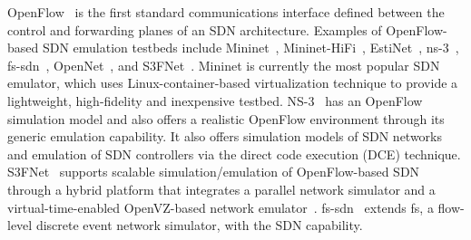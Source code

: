 OpenFlow~\cite{Openflow} is the first standard communications interface defined between the control and forwarding planes of an SDN architecture. 
Examples of OpenFlow-based SDN emulation testbeds include Mininet~\cite{LaptopSDN},
Mininet-HiFi~\cite{ReproNetExprCBE}, EstiNet~\cite{EstiNet}, ns-3~\cite{NS-3}, fs-sdn~\cite{FSSDN}, OpenNet~\cite{OpenNet}, and S3FNet~\cite{jin2013parallel}.
Mininet is currently the most popular SDN emulator, which uses Linux-container-based virtualization technique to provide a lightweight, high-fidelity and inexpensive testbed.
NS-3~\cite{NS-3} has an OpenFlow simulation model and also offers a realistic OpenFlow environment through its generic emulation capability.
It also offers simulation models of SDN networks and emulation of SDN controllers via the direct code execution (DCE) technique.
S3FNet~\cite{jin2013parallel} supports scalable simulation/emulation of OpenFlow-based SDN through
a hybrid platform that integrates a parallel network simulator and a virtual-time-enabled OpenVZ-based network emulator~\cite{S3FWebsite}.
fs-sdn~\cite{FSSDN} extends fs, a flow-level discrete event network simulator, with the SDN capability.


